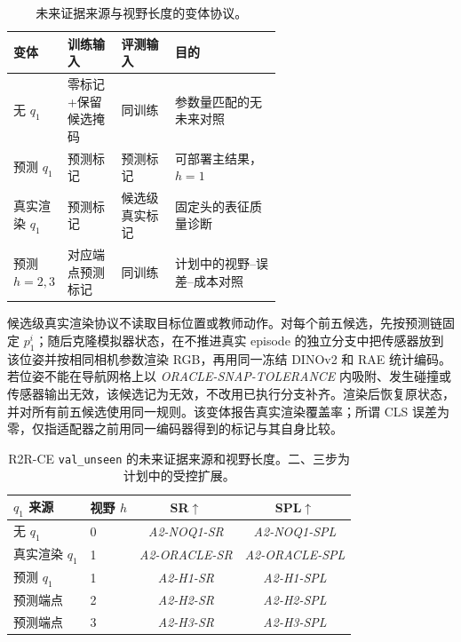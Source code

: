 \documentclass[UTF8,11pt]{ctexart}
\begin{document}
\begin{table}[t]
\centering
\caption{未来证据来源与视野长度的变体协议。}
\label{tab:source-protocol}
\begin{tabularx}{\linewidth}{p{0.20\linewidth}p{0.20\linewidth}p{0.20\linewidth}Y}
\toprule
变体 & 训练输入 & 评测输入 & 目的 \\
\midrule
无 $q_1$ & 零标记+保留候选掩码 & 同训练 & 参数量匹配的无未来对照 \\
预测 $q_1$ & 预测标记 & 预测标记 & 可部署主结果，$h=1$ \\
真实渲染 $q_1$ & 预测标记 & 候选级真实标记 & 固定头的表征质量诊断 \\
预测 $h=2,3$ & 对应端点预测标记 & 同训练 & 计划中的视野--误差--成本对照 \\
\bottomrule
\end{tabularx}
\end{table}

候选级真实渲染协议不读取目标位置或教师动作。对每个前五候选，先按预测链固定 $p_1^i$；随后克隆模拟器状态，在不推进真实 episode 的独立分支中把传感器放到该位姿并按相同相机参数渲染 RGB，再用同一冻结 DINOv2 和 RAE 统计编码。若位姿不能在导航网格上以 \textit{ORACLE-SNAP-TOLERANCE} 内吸附、发生碰撞或传感器输出无效，该候选记为无效，不改用已执行分支补齐。渲染后恢复原状态，并对所有前五候选使用同一规则。该变体报告真实渲染覆盖率；所谓 CLS 误差为零，仅指适配器之前用同一编码器得到的标记与其自身比较。

\begin{table}[t]
\centering
\caption{R2R-CE \texttt{val\_unseen} 的未来证据来源和视野长度。二、三步为计划中的受控扩展。}
\label{tab:horizon}
\begin{tabular}{llcc}
\toprule
$q_1$ 来源 & 视野 $h$ & SR$\uparrow$ & SPL$\uparrow$ \\
\midrule
无 $q_1$ & 0 & \textit{A2-NOQ1-SR} & \textit{A2-NOQ1-SPL} \\
真实渲染 $q_1$ & 1 & \textit{A2-ORACLE-SR} & \textit{A2-ORACLE-SPL} \\
预测 $q_1$ & 1 & \textit{A2-H1-SR} & \textit{A2-H1-SPL} \\
预测端点 & 2 & \textit{A2-H2-SR} & \textit{A2-H2-SPL} \\
预测端点 & 3 & \textit{A2-H3-SR} & \textit{A2-H3-SPL} \\
\bottomrule
\end{tabular}
\end{table}
\end{document}
